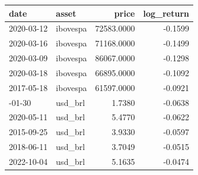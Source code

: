
\begin{tabular}{llrr}
\toprule
date & asset & price & log\_return\\
\midrule
2020-03-12 & ibovespa & 72583.0000 & -0.1599\\
2020-03-16 & ibovespa & 71168.0000 & -0.1499\\
2020-03-09 & ibovespa & 86067.0000 & -0.1298\\
2020-03-18 & ibovespa & 66895.0000 & -0.1092\\
2017-05-18 & ibovespa & 61597.0000 & -0.0921\\
\addlinespace
2012-01-30 & usd\_brl & 1.7380 & -0.0638\\
2020-05-11 & usd\_brl & 5.4770 & -0.0622\\
2015-09-25 & usd\_brl & 3.9330 & -0.0597\\
2018-06-11 & usd\_brl & 3.7049 & -0.0515\\
2022-10-04 & usd\_brl & 5.1635 & -0.0474\\
\bottomrule
\end{tabular}
